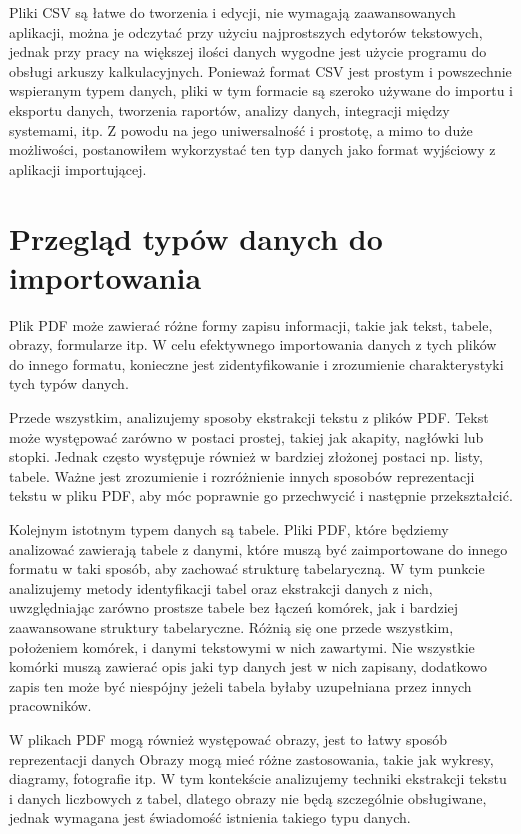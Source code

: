 \documentclass[a4paper,twoside,12pt]{book}
\begin{document}
Pliki CSV są łatwe do tworzenia i edycji, nie wymagają zaawansowanych aplikacji, można je odczytać przy użyciu najprostszych edytorów tekstowych, jednak przy pracy na większej ilości danych wygodne jest użycie programu do obsługi arkuszy kalkulacyjnych. Ponieważ format CSV jest prostym i powszechnie wspieranym typem danych, pliki w tym formacie są szeroko używane do importu i eksportu danych, tworzenia raportów, analizy danych, integracji między systemami, itp. Z powodu na jego uniwersalność i prostotę, a mimo to duże możliwości, postanowiłem wykorzystać ten typ danych jako format wyjściowy z aplikacji importującej.

\section{Przegląd typów danych do importowania}

Plik PDF może zawierać różne formy zapisu informacji, takie jak tekst, tabele, obrazy, formularze itp. W celu efektywnego importowania danych z tych plików do innego formatu, konieczne jest zidentyfikowanie i zrozumienie charakterystyki tych typów danych. 

Przede wszystkim, analizujemy sposoby ekstrakcji tekstu z plików PDF. Tekst może występować zarówno w postaci prostej, takiej jak  akapity, nagłówki lub stopki. Jednak często występuje również w bardziej złożonej postaci np. listy, tabele. Ważne jest zrozumienie i rozróżnienie innych sposobów reprezentacji tekstu w pliku PDF, aby móc poprawnie go przechwycić i następnie przekształcić.

Kolejnym istotnym typem danych są tabele. Pliki PDF, które będziemy analizować zawierają tabele z danymi, które muszą być zaimportowane do innego formatu w taki sposób, aby zachować strukturę tabelaryczną. W tym punkcie analizujemy metody identyfikacji tabel oraz ekstrakcji danych z nich, uwzględniając zarówno prostsze tabele bez łączeń komórek, jak i bardziej zaawansowane struktury tabelaryczne. Różnią się one przede wszystkim, położeniem komórek, i danymi tekstowymi w nich zawartymi. Nie wszystkie komórki muszą zawierać opis jaki typ danych jest w nich zapisany, dodatkowo zapis ten może być niespójny jeżeli tabela byłaby uzupełniana przez innych pracowników.

W plikach PDF mogą również występować obrazy, jest to łatwy sposób reprezentacji danych Obrazy mogą mieć różne zastosowania, takie jak wykresy, diagramy, fotografie itp. W tym kontekście analizujemy techniki ekstrakcji tekstu i danych liczbowych z tabel, dlatego obrazy nie będą szczególnie obsługiwane, jednak wymagana jest świadomość istnienia takiego typu danych.
\end{document}
